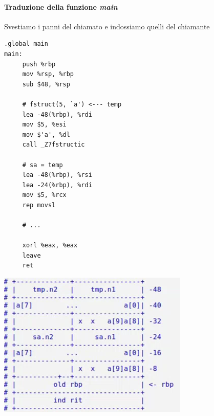 \documentclass[11pt]{report}
\theoremstyle{definition}
\begin{document}
\paragraph{Traduzione della funzione \emph{main}} Svestiamo i panni del chiamato e indossiamo quelli del chiamante
\begin{multicols}{2}\begin{verbatim}
.global main
main:
     push %rbp
     mov %rsp, %rbp
     sub $48, %rsp
     
     # fstruct(5, `a') <--- temp
     lea -48(%rbp), %rdi
     mov $5, %esi
     mov $'a', %dl
     call _Z7fstructic
     
     # sa = temp
     lea -48(%rbp), %rsi
     lea -24(%rbp), %rdi
     mov $5, %rcx
     rep movsl
     
     # ...
     
     xorl %eax, %eax
     leave
     ret
\end{verbatim}
\end{multicols}
\begin{center}
\includegraphics{img/44.PNG}
\end{center}  
\end{document}
